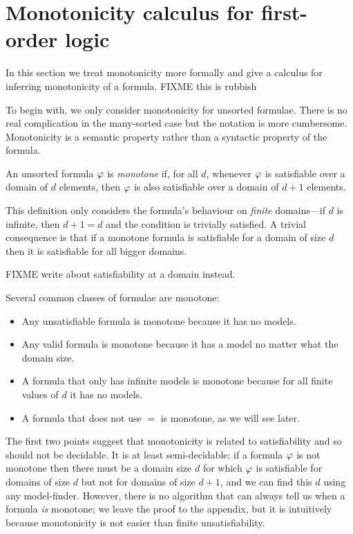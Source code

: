 \section{Monotonicity calculus for first-order logic}

\label{sec_monotonicity}

In this section we treat monotonicity more formally and give a
calculus for inferring monotonicity of a formula. FIXME this is
rubbish

To begin with, we only consider monotonicity for unsorted formulae.
There is no real complication in the many-sorted case but the notation
is more cumbersome. Monotonicity is a semantic property rather than a
syntactic property of the formula.
\begin{definition}
An unsorted formula $\varphi$ is \emph{monotone} if, for all $d$,
whenever $\varphi$ is satisfiable over a domain of $d$ elements,
then $\varphi$ is also satisfiable over a domain of $d+1$ elements.
\end{definition}

This definition only considers the formula's behaviour on
\emph{finite} domains---if $d$ is infinite, then $d+1 = d$ and the
condition is trivially satisfied. A trivial consequence is that if a
monotone formula is satisfiable for a domain of size $d$ then it is
satisfiable for all bigger domains.

FIXME write about satisfiability at a domain instead.

Several common classes of formulae are monotone:
\begin{itemize}
\item Any unsatisfiable formula is monotone because it has no models.
\item Any valid formula is monotone because it has a model no matter
  what the domain size.
\item A formula that only has infinite models is monotone because for
  all finite values of $d$ it has no models.
\item A formula that does not use $=$ is monotone, as we will see
  later.
\end{itemize}

The first two points suggest that monotonicity is related to
satisfiability and so should not be decidable. It is at least
semi-decidable: if a formula $\varphi$ is not monotone then there
must be a domain size $d$ for which $\varphi$ is satisfiable for
domains of size $d$ but not for domains of size $d+1$, and we can find
this $d$ using any model-finder. However, there is no algorithm that
can always tell us when a formula \emph{is} monotone; we leave the
proof to the appendix, but it is intuitively because monotonicity is
not easier than finite unsatisfiability.

